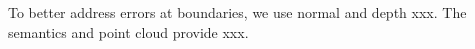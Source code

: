 To better address errors at boundaries, we use normal and depth xxx.
The semantics and point cloud provide xxx.

